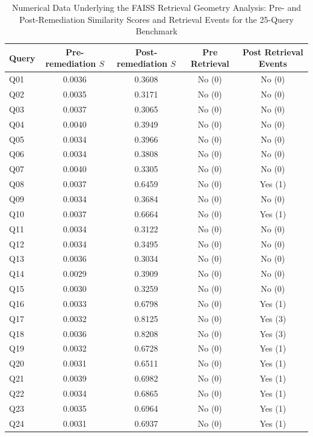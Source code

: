 \begin{table}[t]
\centering
\caption{Numerical Data Underlying the FAISS Retrieval Geometry Analysis: Pre- and Post-Remediation Similarity Scores and Retrieval Events for the 25-Query Benchmark}
\label{tab:fig3_validation}
\footnotesize
\setlength{\tabcolsep}{16pt}
\renewcommand{\arraystretch}{1.03}
\begin{tabular}{l c c c c}
\toprule
\textbf{Query} & \textbf{Pre-remediation $S$} & \textbf{Post-remediation $S$} & \textbf{Pre Retrieval} & \textbf{Post Retrieval Events} \\
\midrule
Q01 & 0.0036 & 0.3608 & No (0) & No (0) \\
Q02 & 0.0035 & 0.3171 & No (0) & No (0) \\
Q03 & 0.0037 & 0.3065 & No (0) & No (0) \\
Q04 & 0.0040 & 0.3949 & No (0) & No (0) \\
Q05 & 0.0034 & 0.3966 & No (0) & No (0) \\
Q06 & 0.0034 & 0.3808 & No (0) & No (0) \\
Q07 & 0.0040 & 0.3305 & No (0) & No (0) \\
Q08 & 0.0037 & 0.6459 & No (0) & Yes (1) \\
Q09 & 0.0034 & 0.3684 & No (0) & No (0) \\
Q10 & 0.0037 & 0.6664 & No (0) & Yes (1) \\
Q11 & 0.0034 & 0.3122 & No (0) & No (0) \\
Q12 & 0.0034 & 0.3495 & No (0) & No (0) \\
Q13 & 0.0036 & 0.3034 & No (0) & No (0) \\
Q14 & 0.0029 & 0.3909 & No (0) & No (0) \\
Q15 & 0.0030 & 0.3259 & No (0) & No (0) \\
Q16 & 0.0033 & 0.6798 & No (0) & Yes (1) \\
Q17 & 0.0032 & 0.8125 & No (0) & Yes (3) \\
Q18 & 0.0036 & 0.8208 & No (0) & Yes (3) \\
Q19 & 0.0032 & 0.6728 & No (0) & Yes (1) \\
Q20 & 0.0031 & 0.6511 & No (0) & Yes (1) \\
Q21 & 0.0039 & 0.6982 & No (0) & Yes (1) \\
Q22 & 0.0034 & 0.6865 & No (0) & Yes (1) \\
Q23 & 0.0035 & 0.6964 & No (0) & Yes (1) \\
Q24 & 0.0031 & 0.6937 & No (0) & Yes (1) \\

\end{tabular}
\end{table}
